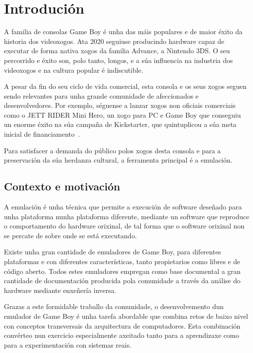 \chapter{Introdución}
\label{chap:introducion}
\lettrine{A}{} familia de consolas Game Boy é unha das máis populares e de maior éxito da historia dos videoxogos. Ata 2020 seguiuse producindo hardware capaz de executar de forma nativa xogos da familia Advance, a Nintendo 3DS.
O seu percorrido e éxito son, polo tanto, longos, e a súa influencia na industria dos videoxogos e na cultura popular é indiscutible.

A pesar da fin do seu ciclo de vida comercial, esta consola e os seus xogos seguen sendo relevantes para unha grande comunidade de afeccionados e desenvolvedores.
Por exemplo, séguense a lanzar xogos non oficiais comerciais como o JETT RIDER Mini Hero, un xogo para PC e Game Boy que conseguiu un enorme éxito na súa campaña de Kickstarter,
que quintuplicou a súa meta inicial de financiamento~\cite{jettriderminihero}.

Para satisfacer a demanda do público polos xogos desta consola e para a preservación da súa herdanza cultural, a ferramenta principal é a emulación.

\section{Contexto e motivación}
\label{sec:contexto}

A emulación é unha técnica que permite a execución de software deseñado para unha plataforma nunha plataforma diferente,
mediante un software que reproduce o comportamento do hardware orixinal,
de tal forma que o software orixinal non se percate de sobre onde se está executando. 

Existe unha gran cantidade de emuladores de Game Boy, para diferentes plataformas e con diferentes características, tanto propietarios como libres e de código aberto.
Todos estes emuladores empregan como base documental a gran cantidade de documentación producida pola comunidade a través da análise do hardware mediante enxeñería inversa.

Grazas a este formidable traballo da comunidade,
o desenvolvemento dun emulador de Game Boy é unha tarefa abordable que combina retos de baixo nivel
con conceptos transversais da arquitectura de computadores.
Esta combinación convérteo nun exercicio especialmente axeitado tanto para a aprendizaxe como para a experimentación con sistemas reais.

